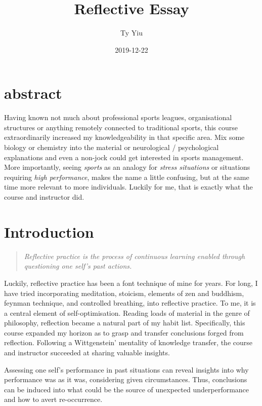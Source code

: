 \documentclass[12pt]{article}
\begin{document}
\title{Reflective Essay}
\author{Ty Yiu}
\date{2019-12-22}
\maketitle
\tableofcontents
\pagebreak

\section*{abstract}
Having known not much about professional sports leagues, organisational
structures or anything remotely connected to traditional sports, this course
extraordinarily increased my knowledgeability in that specific area. 
Mix some biology or chemistry into the material or neurological / psychological
explanations and even a non-jock could get interested in sports management. More
importantly, seeing \textit{sports} as an analogy for \textit{stress situations} or
situations requiring \textit{high performance}, makes the name a little confusing, but
at the same time more relevant to more individuals. 
Luckily for me, that is exactly what the course and instructor did.

\pagebreak

\section{Introduction}
\begin{quotation}
\textit{Reflective practice is the process of continuous learning enabled
through questioning one self's past actions.}
\end{quotation}

Luckily, reflective practice has been a font technique of mine for years.
For long, I have tried incorporating meditation, stoicism, elements of zen and
buddhism, feynman technique, and controlled breathing, into reflective practice. 
To me, it is a central element of self-optimisation. Reading loads of material
in the genre of philosophy, reflection became a natural part of my habit list.
Specifically, this course expanded my horizon as to grasp and transfer
conclusions forged from reflection. Following a Wittgenstein' mentality of
knowledge transfer, the course and instructor succeeded at sharing valuable
insights.

Assessing one self's performance in past situations can reveal insights into why
performance was as it was, considering given circumstances. Thus, conclusions
can be induced into what could be the source of unexpected underperformance and
how to avert re-occurrence. 
\end{document}
